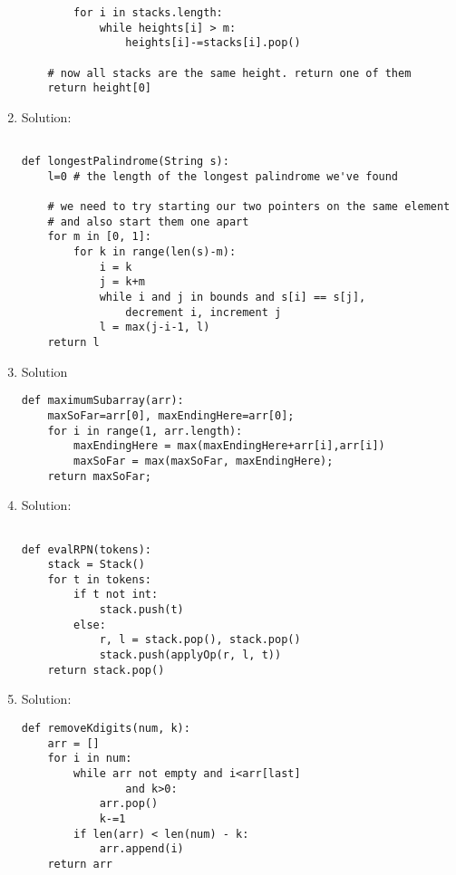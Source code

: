 \documentclass{article}
\begin{document}
\begin{enumerate}
\begin{lstlisting}
        for i in stacks.length:
            while heights[i] > m:
                heights[i]-=stacks[i].pop()
    
    # now all stacks are the same height. return one of them
    return height[0]

\end{lstlisting}

\item Solution:

\begin{lstlisting}

def longestPalindrome(String s):
    l=0 # the length of the longest palindrome we've found
    
    # we need to try starting our two pointers on the same element
    # and also start them one apart
    for m in [0, 1]:
        for k in range(len(s)-m):
            i = k
            j = k+m
            while i and j in bounds and s[i] == s[j],
                decrement i, increment j
            l = max(j-i-1, l)
    return l

\end{lstlisting}

\item Solution

\begin{lstlisting}
def maximumSubarray(arr):
    maxSoFar=arr[0], maxEndingHere=arr[0];
    for i in range(1, arr.length):
    	maxEndingHere = max(maxEndingHere+arr[i],arr[i])
    	maxSoFar = max(maxSoFar, maxEndingHere);	
    return maxSoFar;
\end{lstlisting}

\item Solution:

\begin{lstlisting}

def evalRPN(tokens):
    stack = Stack()
    for t in tokens:
        if t not int:
            stack.push(t)
        else:
            r, l = stack.pop(), stack.pop()
            stack.push(applyOp(r, l, t))
    return stack.pop()
\end{lstlisting}
    
\item Solution:

\begin{lstlisting}
def removeKdigits(num, k):
    arr = []
    for i in num:
        while arr not empty and i<arr[last]
                and k>0:
            arr.pop()
            k-=1
        if len(arr) < len(num) - k:
            arr.append(i)
    return arr


\end{lstlisting}
\end{enumerate}
\end{document}
